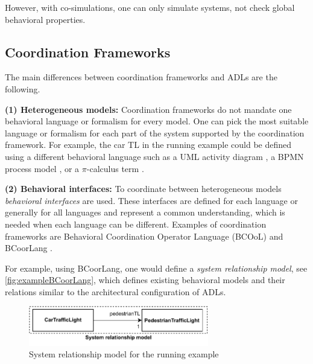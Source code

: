 \documentclass[runningheads]{llncs}
\begin{document}
However, with co-simulations, one can only simulate systems, not check global behavioral properties.

\subsection{Coordination Frameworks} \label{subsec:frameworks}

The main differences between coordination frameworks and ADLs are the following.

\textbf{(1) Heterogeneous models:} Coordination frameworks do not mandate one behavioral language or formalism for every model.
One can pick the most suitable language or formalism for each part of the system supported by the coordination framework.
For example, the car TL in the running example could be defined using a different behavioral language such as a UML activity diagram \cite{objectmanagementgroupUnifiedModelingLanguage2017}, a BPMN process model \cite{objectmanagementgroupBusinessProcessModel2013}, or a $\pi$-calculus term \cite{milnerCommunicatingMobileSystems2010}.

\textbf{(2) Behavioral interfaces:} To coordinate between heterogeneous models \textit{behavioral interfaces} are used.
These interfaces are defined for each language or generally for all languages and represent a common understanding, which is needed when each language can be different.
Examples of coordination frameworks are Behavioral Coordination Operator Language (BCOoL) \cite{varalarsenBCOolBehavioralCoordination2016,varalarsenBehavioralCoordinationOperator2015} and BCoorLang \cite{krauterBehavioralConsistencyMultimodeling2023}.

For example, using BCoorLang, one would define a \textit{system relationship model}, see \autoref{fig:exampleBCoorLang}, which defines existing behavioral models and their relations similar to the architectural configuration of ADLs.

\begin{figure}[ht]
	\centering
	\includegraphics[width=0.7\textwidth]{images/running_example_BCorrLang}
	\caption{System relationship model for the running example}
	\label{fig:exampleBCoorLang}
\end{figure}
\end{document}
